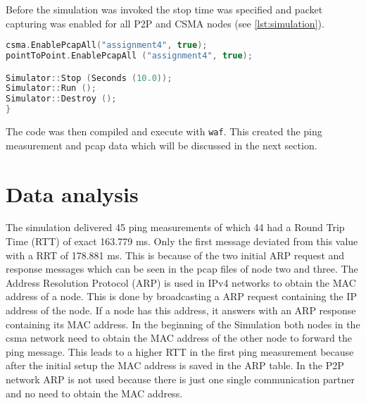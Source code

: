 \documentclass[parskip=full]{scrartcl}
\begin{document}
Before the simulation was invoked the stop time was specified and packet capturing was enabled for all P2P and CSMA nodes (see \cref{lst:simulation}).

\begin{lstlisting}[language=c++, frame=single , captionpos=b, caption={pcap and simulation start}, label=lst:simulation]
csma.EnablePcapAll("assignment4", true);
pointToPoint.EnablePcapAll ("assignment4", true);

Simulator::Stop (Seconds (10.0));
Simulator::Run ();
Simulator::Destroy ();
}
\end{lstlisting}

The code was then compiled and execute with \verb|waf|. This created the ping measurement and pcap data which will be discussed in the next section. 

\section{Data analysis} \label{sec:data}

% 


The simulation delivered 45 ping measurements of which 44 had a Round Trip Time (RTT) of exact 163.779 ms. 
Only the first message deviated from this value with a RRT of 178.881 ms. 
This is because of the two initial ARP request and response messages which can be seen in the pcap files of node two and three.
The Address Resolution Protocol (ARP) is used in IPv4 networks to obtain the MAC address of a node. 
This is done by broadcasting a ARP request containing the IP address of the node. 
If a node has this address, it answers with an ARP response containing its MAC address.
In the beginning of the Simulation both nodes in the csma network need to obtain the MAC address of the other node to forward the ping message.
This leads to a higher RTT in the first ping measurement because after the initial setup the MAC address is saved in the ARP table.
In the P2P network ARP is not used because there is just one single communication partner and no need to obtain the MAC address.
\end{document}

